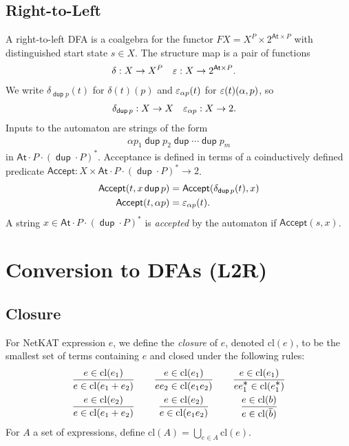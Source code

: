 \documentclass{article}
\newcommand\At{\ensuremath{\mathsf{At}}}
\newcommand\pdup{\mathop{\mathsf{dup}}}
\renewcommand\star{^{\textstyle *}}
\newcommand\acc{\mathsf{Accept}}
\newcommand\clname{\mathrm{cl}}
\newcommand\cl[1]{\clname(#1)}
\begin{document}
\subsection*{Right-to-Left}

A right-to-left DFA is a coalgebra for the functor $FX = X^{P}\times 2^{\At\times P}$ with distinguished start state $s\in X$. The structure map is a pair of functions
\begin{align*}
\delta &: X\to X^{P} & \eps &: X\to 2^{\At\times P}.
\end{align*}
We write $\delta_{\pdup p}(t)$ for $\delta(t)(p)$ and $\varepsilon_{\alpha p}(t)$ for $\varepsilon(t)(\alpha,p)$, so
\begin{align*}
\delta_{\pdup p} &: X\to X & \eps_{\alpha p} &: X\to 2.
\end{align*}
Inputs to the automaton are strings of the form
\begin{align*}
\alpha p_1\pdup p_2\pdup\cdots\pdup p_m
\end{align*}
in $\At\cdot P\cdot(\pdup\cdot P)\star$. Acceptance is defined in terms of a coinductively defined predicate $\acc:X\times\At\cdot P\cdot(\pdup\cdot P)\star\to 2$.
\begin{align*}
\acc(t,x\pdup p) &= \acc(\delta_{\pdup p}(t),x)\\
\acc(t,\alpha p) &= \eps_{\alpha p}(t).
\end{align*}
A string $x\in\At\cdot P\cdot(\pdup\cdot P)\star$ is \emph{accepted} by the automaton if $\acc(s,x)$.

\section*{Conversion to DFAs (L2R)}

\subsection*{Closure}

For NetKAT expression $e$, we define the \emph{closure} of $e$, denoted $\cl e$, to be the smallest set
of terms containing $e$ and closed under the following rules:
\begin{equation}
\begin{array}{c@{\qquad}c@{\qquad}c}
\dfrac{e\in\cl{e_1}}{e\in\cl{e_1+e_2}} & \dfrac{e\in\cl{e_1}}{ee_2\in\cl{e_1e_2}} & \dfrac{e\in\cl{e_1}}{ee_1\star\in\cl{e_1\star}}\\[1em]
\dfrac{e\in\cl{e_2}}{e\in\cl{e_1+e_2}} & \dfrac{e\in\cl{e_2}}{e\in\cl{e_1e_2}} & \dfrac{e\in\cl{b}}{e\in\cl{\bar b}}
\end{array}
\label{eq:cldef}
\end{equation}
For $A$ a set of expressions, define $\cl A = \bigcup_{e\in A} \cl e$.
\end{document}
